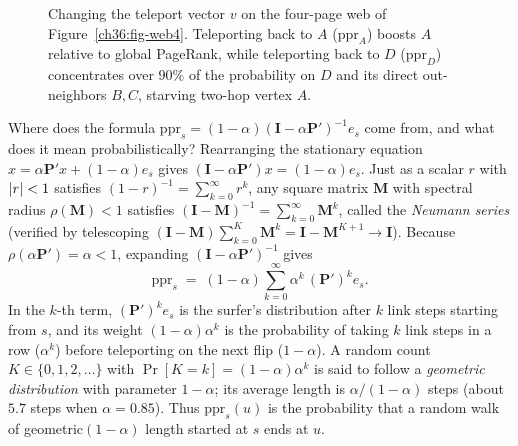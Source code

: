 \begin{figure}[htbp]
\centering
{}
\caption{Changing the teleport vector $v$ on the four-page web of Figure~\ref{ch36:fig-web4}. Teleporting back to $A$ ($\mathrm{ppr}_A$) boosts $A$ relative to global PageRank, while teleporting back to $D$ ($\mathrm{ppr}_D$) concentrates over $90\%$ of the probability on $D$ and its direct out-neighbors $B,C$, starving two-hop vertex $A$.}
\label{ch36:fig-global-vs-ppr}
\end{figure}

\begin{whybox}
Where does the formula $\mathrm{ppr}_s = (1-\alpha)(\mathbf{I} - \alpha\mathbf{P}')^{-1}e_s$ come from, and what does it mean probabilistically? Rearranging the stationary equation $x = \alpha\mathbf{P}'x + (1-\alpha)e_s$ gives $(\mathbf{I}-\alpha\mathbf{P}')x = (1-\alpha)e_s$. Just as a scalar $r$ with $\lvert r\rvert < 1$ satisfies $(1-r)^{-1} = \sum_{k=0}^\infty r^k$, any square matrix $\mathbf{M}$ with spectral radius $\rho(\mathbf{M}) < 1$ satisfies $(\mathbf{I}-\mathbf{M})^{-1} = \sum_{k=0}^\infty \mathbf{M}^k$, called the \emph{Neumann series} (verified by telescoping $(\mathbf{I}-\mathbf{M})\sum_{k=0}^K \mathbf{M}^k = \mathbf{I} - \mathbf{M}^{K+1} \to \mathbf{I}$). Because $\rho(\alpha\mathbf{P}') = \alpha < 1$, expanding $(\mathbf{I}-\alpha\mathbf{P}')^{-1}$ gives
\[
  \mathrm{ppr}_s \;=\; (1-\alpha)\sum_{k=0}^{\infty}\alpha^k\,(\mathbf{P}')^{k} e_s.
\]
In the $k$-th term, $(\mathbf{P}')^k e_s$ is the surfer's distribution after $k$ link steps starting from $s$, and its weight $(1-\alpha)\alpha^k$ is the probability of taking $k$ link steps in a row ($\alpha^k$) before teleporting on the next flip ($1-\alpha$). A random count $K \in \{0,1,2,\dots\}$ with $\Pr[K = k] = (1-\alpha)\alpha^k$ is said to follow a \emph{geometric distribution} with parameter $1-\alpha$; its average length is $\alpha/(1-\alpha)$ steps (about $5.7$ steps when $\alpha = 0.85$). Thus $\mathrm{ppr}_s(u)$ is the probability that a random walk of geometric$(1-\alpha)$ length started at $s$ ends at $u$.
\end{whybox}

